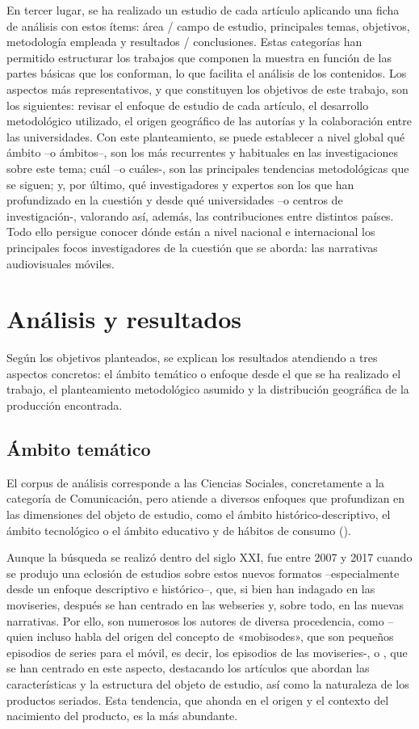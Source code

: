 \documentclass[spanish]{textolivre}
\begin{document}
En tercer lugar, se ha realizado un estudio de cada artículo aplicando una ficha de análisis con estos ítems: área / campo de estudio, principales temas, objetivos, metodología empleada y resultados / conclusiones. Estas categorías han permitido estructurar los trabajos que componen la muestra en función de las partes básicas que los conforman, lo que facilita el análisis de los contenidos. Los aspectos más representativos, y que constituyen los objetivos de este trabajo, son los siguientes: revisar el enfoque de estudio de cada artículo, el desarrollo metodológico utilizado, el origen geográfico de las autorías y la colaboración entre las universidades. Con este planteamiento, se puede establecer a nivel global qué ámbito –o ámbitos–, son los más recurrentes y habituales en las investigaciones sobre este tema; cuál –o cuáles-, son las principales tendencias metodológicas que se siguen; y, por último, qué investigadores y expertos son los que han profundizado en la cuestión y desde qué universidades –o centros de investigación-, valorando así, además, las contribuciones entre distintos países. Todo ello persigue conocer dónde están a nivel nacional e internacional los principales focos investigadores de la cuestión que se aborda: las narrativas audiovisuales móviles.  

\section{Análisis y resultados}
Según los objetivos planteados, se explican los resultados atendiendo a tres aspectos concretos: el ámbito temático o enfoque desde el que se ha realizado el trabajo, el planteamiento metodológico asumido y la distribución geográfica de la producción encontrada.

\subsection{Ámbito temático}
El corpus de análisis corresponde a las Ciencias Sociales, concretamente a la categoría de Comunicación, pero atiende a diversos enfoques que profundizan en las dimensiones del objeto de estudio, como el ámbito histórico-descriptivo, el ámbito tecnológico o el ámbito educativo y de hábitos de consumo (). 

Aunque la búsqueda se realizó dentro del siglo XXI, fue entre 2007 y 2017 cuando se produjo una eclosión de estudios sobre estos nuevos formatos –especialmente desde un enfoque descriptivo e histórico–, que, si bien han indagado en las moviseries, después se han centrado en las webseries y, sobre todo, en las nuevas narrativas. Por ello, son numerosos los autores de diversa procedencia, como \textcite{adelantadomateu2011, barron2013, montoyabermudez2016, saez2010, dawson2012, orgad2009} –quien incluso habla del origen del concepto de «mobisodes», que son pequeños episodios de series para el móvil, es decir, los episodios de las moviseries-, o \textcite{jumiskopyykko2006}, que se han centrado en este aspecto, destacando los artículos que abordan las características y la estructura del objeto de estudio, así como la naturaleza de los productos seriados. Esta tendencia, que ahonda en el origen y el contexto del nacimiento del producto, es la más abundante. 
\end{document}
